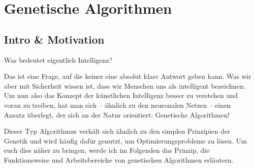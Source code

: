 \usetikzlibrary{calc}
\usetikzlibrary{positioning}
\usetikzlibrary{matrix}


\newtheorem{mydef}{Definition}
\newtheorem{algo}{Variante}

\chapter{Genetische Algorithmen}

\section{Intro \& Motivation}
Was bedeutet eigentlich Intelligenz?

Das ist eine Frage, auf die keiner eine absolut klare Antwort geben kann. Was wir aber mit Sicherheit wissen ist, dass wir Menschen uns als intelligent bezeichnen. Um nun also das Konzept der künstlichen Intelligenz besser zu verstehen und voran zu treiben, hat man sich -- ähnlich zu den neuronalen Netzen -- einen Ansatz überlegt, der sich an der Natur orientiert:
Genetische Algorithmen!

Dieser Typ Algorithmus verhält sich ähnlich zu den simplen Prinzipien der Genetik und wird häufig dafür genutzt, um Optimierungsprobleme zu lösen. Um euch dies näher zu bringen, werde ich im Folgenden das Prinzip, die Funktionsweise und Arbeitsbereiche von genetischen Algorithmen erläutern.

